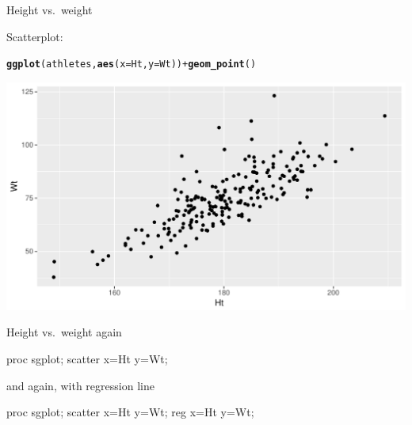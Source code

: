 \documentclass[unknownkeysallowed]{beamer}\usepackage[]{graphicx}\usepackage[]{color}
\makeatletter
\def\maxwidth{ %
  \ifdim\Gin@nat@width>\linewidth
    \linewidth
  \else
    \Gin@nat@width
  \fi
}
\newcommand{\hlopt}[1]{\textcolor[rgb]{0,0,0}{#1}}%
\newcommand{\hlstd}[1]{\textcolor[rgb]{0.345,0.345,0.345}{#1}}%
\newcommand{\hlkwc}[1]{\textcolor[rgb]{0.333,0.667,0.333}{#1}}%
\newcommand{\hlkwd}[1]{\textcolor[rgb]{0.737,0.353,0.396}{\textbf{#1}}}%
\newenvironment{kframe}{%
 \def\at@end@of@kframe{}%
 \ifinner\ifhmode%
  \def\at@end@of@kframe{\end{minipage}}%
  \begin{minipage}{\columnwidth}%
 \fi\fi%
 \def\FrameCommand##1{\hskip\@totalleftmargin \hskip-\fboxsep
 \colorbox{shadecolor}{##1}\hskip-\fboxsep
     \hskip-\linewidth \hskip-\@totalleftmargin \hskip\columnwidth}%
 \MakeFramed {\advance\hsize-\width
   \@totalleftmargin\z@ \linewidth\hsize
   \@setminipage}}%
 {\par\unskip\endMakeFramed%
 \at@end@of@kframe}
\newenvironment{knitrout}{}{} %
\makeatother
\begin{document}
\begin{frame}[fragile]{Height vs.\ weight}
  
  Scatterplot:
  
\begin{knitrout}
\color{fgcolor}\begin{kframe}
\begin{alltt}
\hlkwd{ggplot}\hlstd{(athletes,}\hlkwd{aes}\hlstd{(}\hlkwc{x}\hlstd{=Ht,}\hlkwc{y}\hlstd{=Wt))}\hlopt{+}\hlkwd{geom_point}\hlstd{()}
\end{alltt}
\end{kframe}
\includegraphics[width=\maxwidth]{figure/unnamed-chunk-28-1} 

\end{knitrout}
  
\end{frame}

\begin{frame}[fragile]{Height vs.\ weight again}
  
  \begin{Sascode}[store=gh]
proc sgplot;
  scatter x=Ht y=Wt;
  \end{Sascode}
  
  
\end{frame}

\begin{frame}[fragile]{and again, with regression line}
  
  \begin{Sascode}[store=gj]
proc sgplot;
  scatter x=Ht y=Wt;
  reg x=Ht y=Wt;
  \end{Sascode}
  
  
  
\end{frame}
\end{document}
